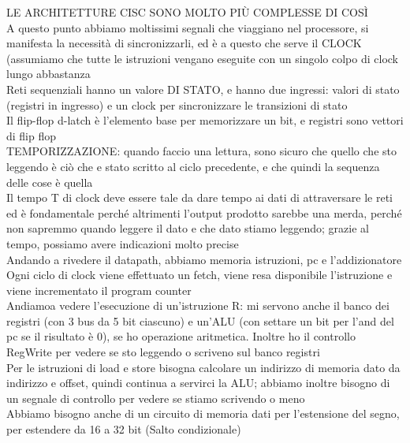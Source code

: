 \documentclass[class=book, crop=false, oneside]{standalone}
\begin{document}
LE ARCHITETTURE CISC SONO MOLTO PIÙ COMPLESSE DI COSÌ\\

A questo punto abbiamo moltissimi segnali che viaggiano nel processore, si manifesta la necessità di sincronizzarli, ed è a questo che serve il CLOCK (assumiamo che tutte le istruzioni vengano eseguite con un singolo colpo di clock lungo abbastanza\\

Reti sequenziali hanno un valore DI STATO, e hanno due ingressi: valori di stato (registri in ingresso) e un clock per sincronizzare le transizioni di stato\\

Il flip-flop d-latch è l’elemento base per memorizzare un bit, e registri sono vettori di flip flop\\

TEMPORIZZAZIONE: quando faccio una lettura, sono sicuro che quello che sto leggendo è ciò che e stato scritto al ciclo precedente, e che quindi la sequenza delle cose è quella\\

Il tempo T di clock deve essere tale da dare tempo ai dati di attraversare le reti ed è fondamentale perché altrimenti l’output prodotto sarebbe una merda, perché non sapremmo quando leggere il dato e che dato stiamo leggendo; grazie al tempo, possiamo avere indicazioni molto precise\\

Andando a rivedere il datapath, abbiamo memoria istruzioni, pc e l’addizionatore\\

Ogni ciclo di clock viene effettuato un fetch, viene resa disponibile l’istruzione e viene incrementato il program counter\\

Andiamoa  vedere l’esecuzione di un’istruzione R: mi servono anche il banco dei registri (con 3 bus da 5 bit ciascuno) e un’ALU (con settare un bit per l’and del pc se il risultato è 0), se ho operazione aritmetica. Inoltre ho il controllo RegWrite per vedere se sto leggendo o scriveno sul banco registri\\

Per le istruzioni di load e store bisogna calcolare un indirizzo di memoria dato da indirizzo e offset, quindi continua a servirci la ALU; abbiamo inoltre bisogno di un segnale di controllo per vedere se stiamo scrivendo o meno\\

Abbiamo bisogno anche di un circuito di memoria dati per l’estensione del segno, per estendere da 16 a 32 bit
(Salto condizionale)
\end{document}
